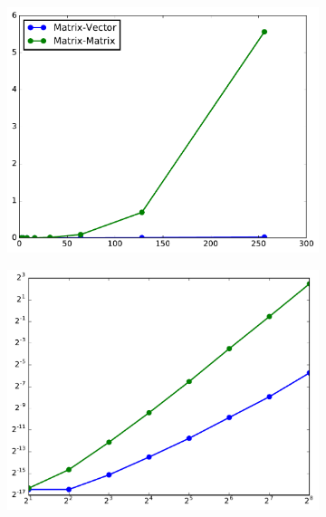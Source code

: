 \begin{figure}[H] %
\captionsetup[subfigure]{justification=centering}
\centering
\begin{subfigure}{.5\textwidth}
    \centering
    \includegraphics[width=\linewidth]{figures/loglogDemoBad.pdf}
\end{subfigure}%
\begin{subfigure}{.5\textwidth}
    \centering
    \includegraphics[width=\linewidth]{figures/loglogDemoGood.pdf}
\end{subfigure}
\caption{ }
\label{fig:loglogdemo}
\end{figure}

